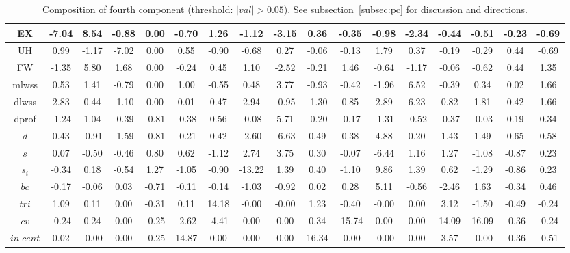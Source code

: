 \documentclass[%
 aip,
 jmp,%
 amsmath,amssymb,
 reprint,%
]{revtex4-1}
\begin{document}
\begin{table}
\begin{tabular}{|c|| c|c|c|c|| c|c|c|c|| c|c|c|c|| c|c|c|c|}
EX & -7.04 & 8.54 & -0.88 & 0.00 & -0.70 & 1.26 & -1.12 & -3.15 & 0.36 & -0.35 & -0.98 & -2.34 & -0.44 & -0.51 & -0.23 & -0.69 \\\hline
UH & 0.99 & -1.17 & -7.02 & 0.00 & 0.55 & -0.90 & -0.68 & 0.27 & -0.06 & -0.13 & 1.79 & 0.37 & -0.19 & -0.29 & 0.44 & -0.69 \\\hline
FW & -1.35 & 5.80 & 1.68 & 0.00 & -0.24 & 0.45 & 1.10 & -2.52 & -0.21 & 1.46 & -0.64 & -1.17 & -0.06 & -0.62 & 0.44 & 1.35 \\\hline
mlwss & 0.53 & 1.41 & -0.79 & 0.00 & 1.00 & -0.55 & 0.48 & 3.77 & -0.93 & -0.42 & -1.96 & 6.52 & -0.39 & 0.34 & 0.02 & 1.66 \\\hline
dlwss & 2.83 & 0.44 & -1.10 & 0.00 & 0.01 & 0.47 & 2.94 & -0.95 & -1.30 & 0.85 & 2.89 & 6.23 & 0.82 & 1.81 & 0.42 & 1.66 \\\hline
dprof & -1.24 & 1.04 & -0.39 & -0.81 & -0.38 & 0.56 & -0.08 & 5.71 & -0.20 & -0.17 & -1.31 & -0.52 & -0.37 & -0.03 & 0.19 & 0.34 \\\hline
$d$ & 0.43 & -0.91 & -1.59 & -0.81 & -0.21 & 0.42 & -2.60 & -6.63 & 0.49 & 0.38 & 4.88 & 0.20 & 1.43 & 1.49 & 0.65 & 0.58 \\\hline
$s$ & 0.07 & -0.50 & -0.46 & 0.80 & 0.62 & -1.12 & 2.74 & 3.75 & 0.30 & -0.07 & -6.44 & 1.16 & 1.27 & -1.08 & -0.87 & 0.23 \\\hline
$s_i$ & -0.34 & 0.18 & -0.54 & 1.27 & -1.05 & -0.90 & -13.22 & 1.39 & 0.40 & -1.10 & 9.86 & 1.39 & 0.62 & -1.29 & -0.86 & 0.23 \\\hline
$bc$ & -0.17 & -0.06 & 0.03 & -0.71 & -0.11 & -0.14 & -1.03 & -0.92 & 0.02 & 0.28 & 5.11 & -0.56 & -2.46 & 1.63 & -0.34 & 0.46 \\\hline
$tri$ & 1.09 & 0.11 & 0.00 & -0.31 & 0.11 & 14.18 & -0.00 & -0.00 & 1.23 & -0.40 & -0.00 & 0.00 & 3.12 & -1.50 & -0.49 & -0.24 \\\hline
$cv$ & -0.24 & 0.24 & 0.00 & -0.25 & -2.62 & -4.41 & 0.00 & 0.00 & 0.34 & -15.74 & 0.00 & 0.00 & 14.09 & 16.09 & -0.36 & -0.24 \\\hline
$in\;cent$ & 0.02 & -0.00 & 0.00 & -0.25 & 14.87 & 0.00 & 0.00 & 0.00 & 16.34 & -0.00 & -0.00 & 0.00 & 3.57 & -0.00 & -0.36 & -0.51 \\\hline
\end{tabular}
  \caption{Composition of fourth component (threshold: $|val|>0.05$). See subsection~\ref{subsec:pc} for discussion and directions.}\label{tab:pca4}
\end{table}
\end{document}
